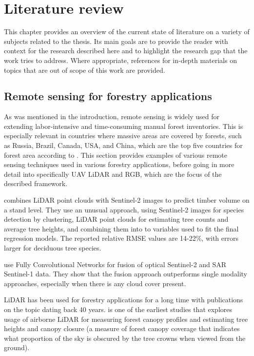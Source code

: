 \chapter{Literature review}\label{cap:literature}

This chapter provides an overview of the current state of literature on a variety of subjects related to the thesis.
Its main goals are to provide the reader with context for the research described here and to highlight the research gap that the work tries to address.
Where appropriate, references for in-depth materials on topics that are out of scope of this work are provided.

\section{Remote sensing for forestry applications}

As was mentioned in the introduction, remote sensing is widely used for extending labor-intensive and time-consuming manual forest inventories.
This is especially relevant in countries where massive areas are covered by forests, such as Russia, Brazil, Canada, USA, and China, which are the top five countries for forest area according to \cite{GlobalForestResources2020}.
This section provides examples of various remote sensing techniques used in various forestry applications, before going in more detail into specifically UAV LiDAR and RGB, which are the focus of the described framework.

\cite{sinica-sinavskisForestStandVolume2022} combines LiDAR point clouds with Sentinel-2 images to predict timber volume on a stand level.
They use an unusual approach, using Sentinel-2 images for species detection by clustering, LiDAR point clouds for estimating tree counts and average tree heights, and combining them into to variables used to fit the final regression models.
The reported relative RMSE values are 14-22\%, with errors larger for deciduous tree species.

\cite{ferrariFusingSentinel1Sentinel22023} use Fully Convolutional Networks \cite{longFullyConvolutionalNetworks2015} for fusion of optical Sentinel-2 and SAR Sentinel-1 data.
They show that the fusion approach outperforms single modality approaches, especially when there is any cloud cover present.

LiDAR has been used for forestry applications for a long time with publications on the topic dating back 40 years.
\cite{nelsonDeterminingForestCanopy1984} is one of the earliest studies that explores usage of airborne LiDAR for measuring forest canopy profiles and estimating tree heights and canopy closure (a measure of forest canopy coverage that indicates what proportion of the sky is obscured by the tree crowns when viewed from the ground).

